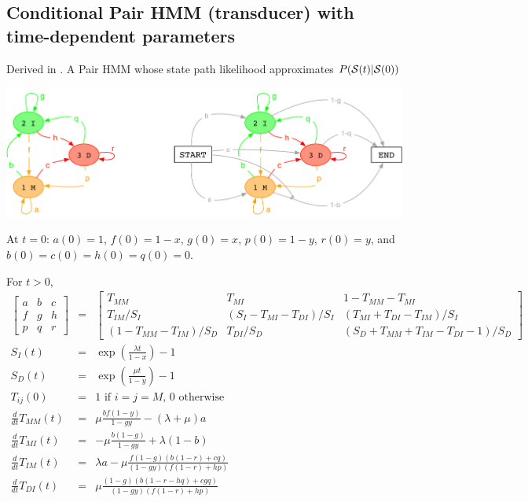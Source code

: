 \documentclass{article}
\begin{document}
\subsection{Conditional Pair HMM (transducer) with time-dependent parameters}
Derived in \cite{Holmes2020}.
A Pair HMM whose state path likelihood approximates $P({\cal S}(t)|{\cal S}(0))$

\includegraphics[width=\textwidth]{PairHMM.pdf}

At $t=0$: $a(0)=1$, $f(0)=1-x$, $g(0)=x$, $p(0)=1-y$, $r(0)=y$, and $b(0)=c(0)=h(0)=q(0)=0$.

For $t>0$, %
\begin{eqnarray*}
\begin{bmatrix}
a & b & c \\
f & g & h \\
p & q & r 
\end{bmatrix}
& = &
\begin{bmatrix}
T_{MM} & T_{MI} & 1-T_{MM}-T_{MI} \\
T_{IM}/S_I & (S_I-T_{MI}-T_{DI})/S_I & (T_{MI}+T_{DI}-T_{IM})/S_I \\
(1-T_{MM}-T_{IM})/S_D & T_{DI}/S_D & (S_D+T_{MM}+T_{IM}-T_{DI}-1)/S_D 
\end{bmatrix}
\\
S_I(t) & = & \exp\left(\frac{\lambda t}{1-x}\right)-1 \\
S_D(t) & = & \exp\left(\frac{\mu t}{1-y}\right)-1 \\
T_{ij}(0) & = & \mbox{1 if $i=j=M$, 0 otherwise}
\\
  \frac{d}{dt} T_{MM}(t) & = &
  \mu \frac{b f (1-y)}{1 - g y}-(\lambda +\mu )a
  \nonumber \\
  \frac{d}{dt} T_{MI}(t) & = &
  -\mu \frac{b (1-g)}{1 - g y} + \lambda (1-b)
  \nonumber \\
  \frac{d}{dt} T_{IM}(t) & = &
  \lambda a - \mu \frac{f (1-g) (b (1-r)+c q)}{(1 - g y) (f (1-r)+h p)}
  \nonumber \\
  \frac{d}{dt} T_{DI}(t) & = &
  \mu \frac{(1-g) (b (1-r-h q)+c g q)}{(1-g y) (f (1-r)+h p)}
\end{eqnarray*}
\end{document}
